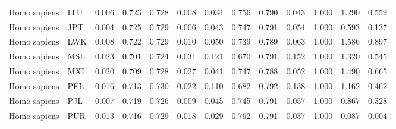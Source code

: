 \begin{longtable}{llrrrrrrrrrrr}
        Homo sapiens &                       ITU &                              0.006 &                               0.723 &                 0.728 &                 0.008 &                              0.034 &                               0.756 &                 0.790 &                 0.043 &        1.000 &  1.290 &  0.559 \\
        Homo sapiens &                       JPT &                              0.004 &                               0.725 &                 0.729 &                 0.006 &                              0.043 &                               0.747 &                 0.791 &                 0.054 &        1.000 &  0.593 &  0.137 \\
        Homo sapiens &                       LWK &                              0.008 &                               0.722 &                 0.729 &                 0.010 &                              0.050 &                               0.739 &                 0.789 &                 0.063 &        1.000 &  1.586 &  0.897 \\
        Homo sapiens &                       MSL &                              0.023 &                               0.701 &                 0.724 &                 0.031 &                              0.121 &                               0.670 &                 0.791 &                 0.152 &        1.000 &  1.320 &  0.545 \\
        Homo sapiens &                       MXL &                              0.020 &                               0.709 &                 0.728 &                 0.027 &                              0.041 &                               0.747 &                 0.788 &                 0.052 &        1.000 &  1.490 &  0.665 \\
        Homo sapiens &                       PEL &                              0.016 &                               0.713 &                 0.730 &                 0.022 &                              0.110 &                               0.682 &                 0.792 &                 0.138 &        1.000 &  1.162 &  0.462 \\
        Homo sapiens &                       PJL &                              0.007 &                               0.719 &                 0.726 &                 0.009 &                              0.045 &                               0.745 &                 0.791 &                 0.057 &        1.000 &  0.867 &  0.328 \\
        Homo sapiens &                       PUR &                              0.013 &                               0.716 &                 0.729 &                 0.018 &                              0.029 &                               0.762 &                 0.791 &                 0.037 &        1.000 &  0.087 &  0.004 \\

\end{longtable}
